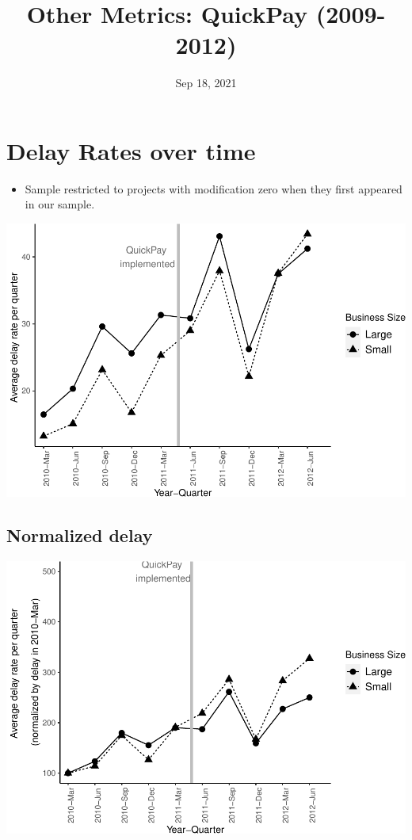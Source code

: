 \documentclass[
]{article}
\title{Other Metrics: QuickPay (2009-2012)}
\author{}
\date{\vspace{-2.5em}Sep 18, 2021}
\providecommand{\tightlist}{%
  \setlength{\itemsep}{0pt}\setlength{\parskip}{0pt}}
\begin{document}
\maketitle

\hypertarget{delay-rates-over-time}{%
\section{Delay Rates over time}\label{delay-rates-over-time}}

\begin{itemize}
\tightlist
\item
  Sample restricted to projects with modification zero when they first
  appeared in our sample.
\end{itemize}

\includegraphics{qp_first_delay_files/figure-latex/plot_relative_delay-1.pdf}

\hypertarget{normalized-delay}{%
\subsection{Normalized delay}\label{normalized-delay}}

\includegraphics{qp_first_delay_files/figure-latex/normalized_plot-1.pdf}
\end{document}
